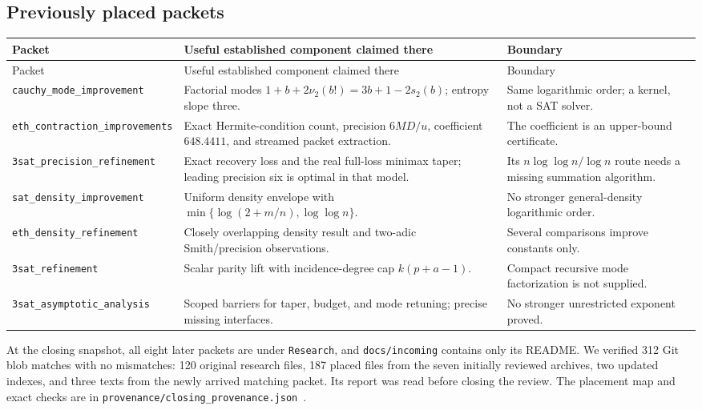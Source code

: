 \documentclass[11pt,letterpaper]{article}
\theoremstyle{definition}\newtheorem{definition}[theorem]{Definition}
\theoremstyle{remark}\newtheorem{remark}[theorem]{Remark}
\begin{document}
\subsection{Previously placed packets}
\small
\begin{longtable}{@{}p{}p{}p{}@{}}
\toprule
Packet & Useful established component claimed there & Boundary\\
\midrule\endfirsthead
\toprule Packet & Useful established component claimed there & Boundary\\\midrule\endhead
\nolinkurl{cauchy_mode_improvement} & Factorial modes
$1+b+2\nu_2(b!)=3b+1-2s_2(b)$; entropy slope three. & Same logarithmic order; a kernel, not a SAT solver.\\[4pt]
\nolinkurl{eth_contraction_improvements} & Exact Hermite-condition count, precision
$6MD/u$, coefficient $648.4411$, and streamed packet extraction. & The coefficient is an upper-bound certificate.\\[4pt]
\nolinkurl{3sat_precision_refinement} & Exact recovery loss and the real full-loss
minimax taper; leading precision six is optimal in that model. & Its $n\log\log n/\log n$ route needs a missing summation algorithm.\\[4pt]
\nolinkurl{sat_density_improvement} & Uniform density envelope with
$\min\{\log(2+m/n),\log\log n\}$. & No stronger general-density logarithmic order.\\[4pt]
\nolinkurl{eth_density_refinement} & Closely overlapping density result and two-adic
Smith/precision observations. & Several comparisons improve constants only.\\[4pt]
\nolinkurl{3sat_refinement} & Scalar parity lift with incidence-degree cap
$k(p+a-1)$. & Compact recursive mode factorization is not supplied.\\[4pt]
\nolinkurl{3sat_asymptotic_analysis} & Scoped barriers for taper, budget, and mode
retuning; precise missing interfaces. & No stronger unrestricted exponent proved.\\
\bottomrule
\end{longtable}
\normalsize
At the closing snapshot, all eight later packets are under \nolinkurl{Research}, and
\nolinkurl{docs/incoming} contains only its README. We verified 312 Git blob matches with
no mismatches: 120 original research files, 187 placed files from the seven initially
reviewed archives, two updated indexes, and three texts from the newly arrived matching
packet. Its report was read before closing the review. The placement map and exact
checks are in \nolinkurl{provenance/closing_provenance.json}~\cite{closing}.\par
\end{document}
